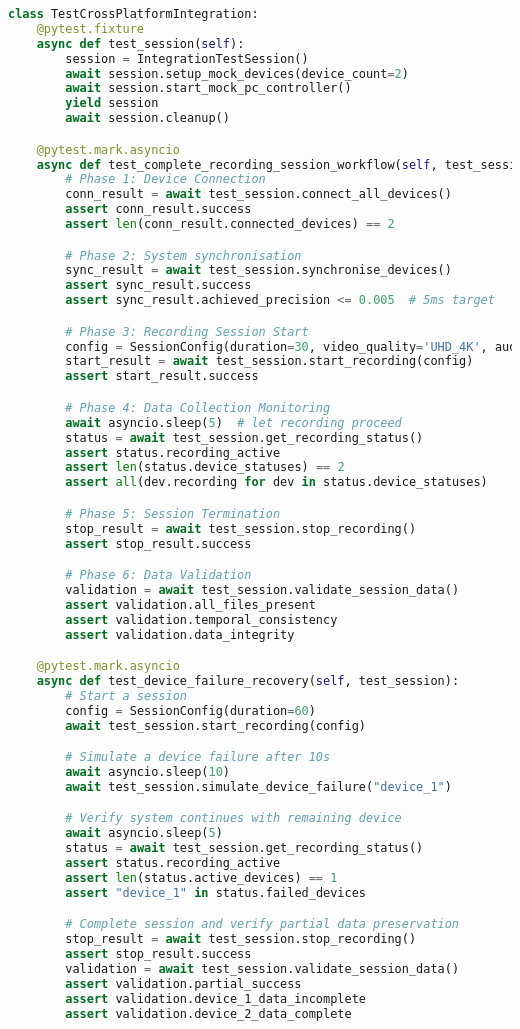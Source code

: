 \documentclass[11pt,a4paper]{report}
\begin{document}
\begin{lstlisting}[language=Python]
class TestCrossPlatformIntegration:
    @pytest.fixture
    async def test_session(self):
        session = IntegrationTestSession()
        await session.setup_mock_devices(device_count=2)
        await session.start_mock_pc_controller()
        yield session
        await session.cleanup()

    @pytest.mark.asyncio
    async def test_complete_recording_session_workflow(self, test_session):
        # Phase 1: Device Connection
        conn_result = await test_session.connect_all_devices()
        assert conn_result.success
        assert len(conn_result.connected_devices) == 2

        # Phase 2: System synchronisation
        sync_result = await test_session.synchronise_devices()
        assert sync_result.success
        assert sync_result.achieved_precision <= 0.005  # 5ms target

        # Phase 3: Recording Session Start
        config = SessionConfig(duration=30, video_quality='UHD_4K', audio_enabled=False, thermal_enabled=True, gsr_enabled=True)
        start_result = await test_session.start_recording(config)
        assert start_result.success

        # Phase 4: Data Collection Monitoring
        await asyncio.sleep(5)  # let recording proceed
        status = await test_session.get_recording_status()
        assert status.recording_active
        assert len(status.device_statuses) == 2
        assert all(dev.recording for dev in status.device_statuses)

        # Phase 5: Session Termination
        stop_result = await test_session.stop_recording()
        assert stop_result.success

        # Phase 6: Data Validation
        validation = await test_session.validate_session_data()
        assert validation.all_files_present
        assert validation.temporal_consistency
        assert validation.data_integrity

    @pytest.mark.asyncio
    async def test_device_failure_recovery(self, test_session):
        # Start a session
        config = SessionConfig(duration=60)
        await test_session.start_recording(config)

        # Simulate a device failure after 10s
        await asyncio.sleep(10)
        await test_session.simulate_device_failure("device_1")

        # Verify system continues with remaining device
        await asyncio.sleep(5)
        status = await test_session.get_recording_status()
        assert status.recording_active
        assert len(status.active_devices) == 1
        assert "device_1" in status.failed_devices

        # Complete session and verify partial data preservation
        stop_result = await test_session.stop_recording()
        assert stop_result.success
        validation = await test_session.validate_session_data()
        assert validation.partial_success
        assert validation.device_1_data_incomplete
        assert validation.device_2_data_complete
\end{lstlisting}
\end{document}
